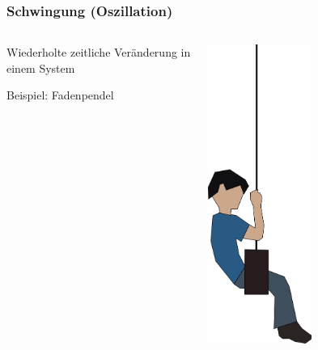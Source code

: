\documentclass{beamer}
\begin{document}
\begin{frame}
\frametitle{Schwingung (Oszillation)}

\begin{columns}[c]
\begin{column}{7cm}
Wiederholte zeitliche Veränderung in einem System \\[1 cm]

\pause

Beispiel: Fadenpendel

\end{column}
\pause
\begin{column}{3cm}


\begin{center}
\includegraphics[width=0.5\textwidth]{kind_schaukel.png}
\end{center}



\end{column}

\end{columns}



\end{frame}
\end{document}
